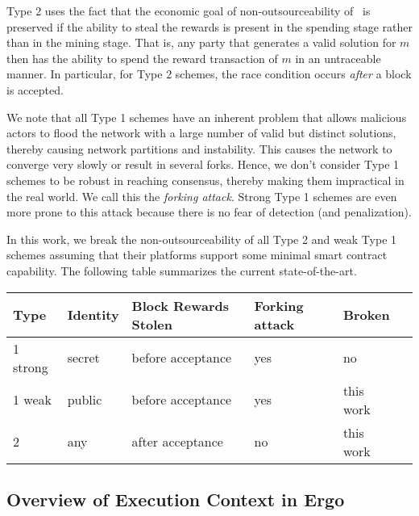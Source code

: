 \documentclass[11pt]{article}
\begin{document}
Type 2 uses the fact that the economic goal of non-outsourceability of~\cite{miller2015nonoutsourceable} is preserved if the ability to steal the rewards is present in the spending stage rather than in the mining stage. That is, any party that generates a valid solution for $m$ then has the ability to spend the reward transaction of $m$ in an untraceable manner. 
In particular, for Type 2 schemes, the race condition occurs {\em after} a block is accepted. 

We note that all Type 1 schemes have an inherent problem that allows malicious actors to flood the network with a large number of valid but distinct solutions, thereby causing network partitions and instability. This causes the network to converge very slowly or result in several forks. Hence, we don't consider Type 1 schemes to be robust in reaching consensus, thereby making them impractical in the real world. We call this the {\em forking attack}. Strong Type 1 schemes are even more prone to this attack because there is no fear of detection (and penalization). 

In this work, we break the non-outsourceability of all Type 2 and weak Type 1 schemes assuming that their platforms support
some minimal smart contract capability. The following table summarizes the current state-of-the-art. 


	\begin{tabular}{llllll}
		  Type     & Identity   & Block Rewards Stolen       & Forking attack & Broken \\\hline
		  1 strong & secret           & before acceptance  & yes            & no\\
		  1 weak   & public           & before acceptance  & yes            & this work\\
		  2        & any              & after acceptance   & no             & this work
	\end{tabular}


\subsection{Overview of Execution Context in Ergo}
\end{document}
